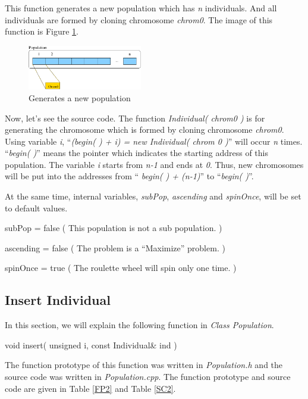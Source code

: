 \documentclass[twocolumn]{article}
\begin{document}
\noindent
This function generates a new population which has {\em n}
individuals. And all individuals are formed by cloning chromosome {\em
chrom0}. The image of this function is Figure \ref{GeneratePop}.

\begin{figure}[h]
\begin{center}
\includegraphics[width=5cm]{004-4-1-population5.eps}
\caption{Generates a new population}
\label{GeneratePop}
\end{center}
\end{figure}

\noindent
Now, let's see the source code. The function {\em Individual( chrom0
)} is for generating the chromosome which is formed by cloning
chromosome {\em chrom0}. Using variable {\em i}, ``{\em *(begin( ) + i)
= new Individual( chrom 0 )}'' will occur {\em n} times. ``{\em begin(
)}'' means the pointer which indicates the starting address of this
population. The variable {\em i} starts from {\em n-1} and ends at
{\em 0}. Thus, new chromosomes will be put into the addresses from ``{\em
begin( ) + (n-1)}'' to ``{\em begin( )}''.

\noindent
At the same time, internal variables, {\em subPop}, {\em ascending}
and {\em spinOnce}, will be set to default values.

{\small
\noindent
subPop = false ( This population is not a sub population. )

\noindent
ascending = false ( The problem is a ``Maximize'' problem. )

\noindent
spinOnce = true ( The roulette wheel will spin only one time. )
}

\subsection{Insert Individual}

\noindent
In this section, we will explain the following function in {\em Class
Population}. 

\begin{center}
void insert( unsigned i, const Individual\& ind )
\end{center}

\noindent
The function prototype of this function was written in {\em
Population.h} and the source code was written in {\em
Population.cpp}. The function prototype and source code are given in Table
\ref{FP2} and Table \ref{SC2}.
\end{document}
